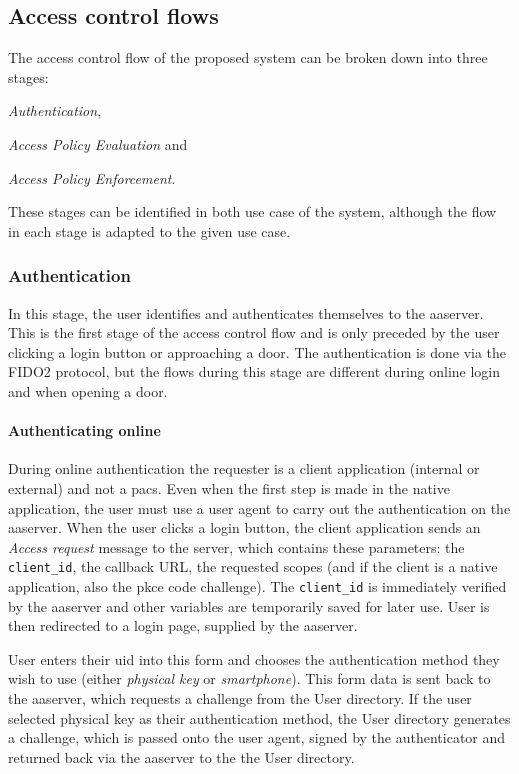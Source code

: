 \subsection{Access control flows}

The access control flow of the proposed system can be broken down into three stages:
\begin{enumerate*}[label=(\roman*)]
    \item \textit{Authentication},
    \item \textit{Access Policy Evaluation} and
    \item \textit{Access Policy Enforcement}.
\end{enumerate*}
These stages can be identified in both use case of the system, although the flow in each stage is adapted to the given use case.

\subsubsection{Authentication}
In this stage, the user identifies and authenticates themselves to the \acrshort{aaserver}. This is the first stage of the access control flow and is only preceded by the user clicking a login button or approaching a door. The authentication is done via the FIDO2 protocol, but the flows during this stage are different during online login and when opening a door.

\paragraph{Authenticating online} During online authentication the requester is a client application (internal or external) and not a \acrshort{pacs}. Even when the first step is made in the native application, the user must use a user agent to carry out the authentication on the \acrshort{aaserver}. When the user clicks a login button, the client application sends an \textit{Access request} message to the server, which contains these parameters: the \texttt{client\_id}, the callback URL, the requested scopes (and if the client is a native application, also the \acrshort{pkce} code challenge). The \texttt{client\_id} is immediately verified by the \acrshort{aaserver} and other variables are temporarily saved for later use. User is then redirected to a login page, supplied by the \acrshort{aaserver}. 

User enters their \acrshort{uid} into this form and chooses the authentication method they wish to use (either \textit{physical key} or \textit{smartphone}). This form data is sent back to the \acrshort{aaserver}, which requests a challenge from the User directory. If the user selected physical key as their authentication method, the User directory generates a challenge, which is passed onto the user agent, signed by the authenticator and returned back via the \acrshort{aaserver} to the the User directory.

